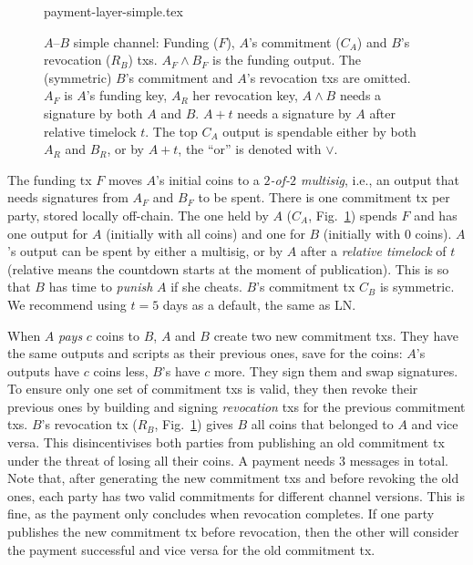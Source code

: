   \begin{figure}[!htbp]
    \centering
    {payment-layer-simple.tex}
    \caption{$A$--$B$ simple channel: Funding ($F$), $A$'s commitment ($C_A$) and $B$'s
    revocation ($R_B$) txs. $A_F \wedge B_F$ is the funding output.
    The (symmetric) $B$'s commitment and
    $A$'s revocation txs are omitted.
    $A_F$ is $A$'s funding key, $A_R$ her revocation key, $A \wedge B$ needs
    a signature by both $A$ and $B$. $A+t$ needs a signature
    by $A$ after relative timelock $t$. The top $C_A$ output is
    spendable either by both $A_R$ and $B_R$, or by $A + t$, the ``or'' is denoted with $\vee$.}
    \label{figure:payment-layer-simple}
  \end{figure}

  The funding tx $F$ moves $A$'s initial coins to a \emph{$2$-of-$2$ multisig}, i.e., an
  output that needs signatures from $A_F$ and $B_F$ to be spent. There is one
  commitment tx per party, stored locally off-chain. The one held by $A$
  ($C_A$, Fig.~\ref{figure:payment-layer-simple}) spends $F$
  and has one output for $A$ (initially with all coins) and one for $B$
  (initially with $0$ coins). $A$'s output can be spent by either a multisig, or
  by $A$ after a \emph{relative timelock} of $t$ (relative means the countdown starts at the moment of
  publication). This is so
  that $B$ has time to \emph{punish} $A$ if she cheats. $B$'s commitment tx
  $C_B$ is symmetric. We recommend using $t = 5$ days as a default, the same as
  LN.

  When $A$ \emph{pays} $c$ coins to $B$, $A$ and $B$ create two new
  commitment txs.
  They have the same outputs and scripts as their previous ones, save for the
  coins: $A$'s outputs have $c$ coins less, $B$'s have $c$ more.
  They sign them and swap signatures. To ensure only one set of
  commitment txs is valid, they then revoke their previous ones by
  building and signing \emph{revocation} txs for the previous
  commitment txs. $B$'s revocation tx ($R_B$,
  Fig.~\ref{figure:payment-layer-simple}) gives $B$ all coins that belonged
  to $A$ and vice versa. This disincentivises both parties
  from publishing an old commitment tx under the threat of
  losing all their coins. A payment needs $3$ messages in total. Note
  that, after generating the new commitment txs and before revoking the old
  ones, each party has two valid commitments for different channel versions.
  This is fine, as the payment only concludes when revocation completes. If one
  party publishes the new commitment tx before revocation, then the
  other will consider the payment successful and vice versa for the old
  commitment tx.

